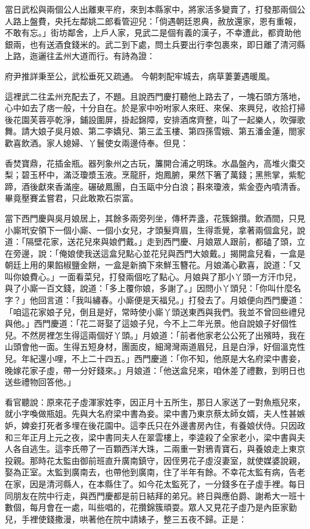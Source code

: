\begin{showcontents}{}
當日武松與兩個公人出離東平府，來到本縣家中，將家活多變賣了，打發那兩個公人路上盤費，央托左鄰姚二郎看管迎兒：「倘遇朝廷恩典，赦放還家，恩有重報，不敢有忘。」街坊鄰舍，上戶人家，見武二是個有義的漢子，不幸遭此，都資助他銀兩，也有送酒食錢米的。武二到下處，問土兵要出行李包裹來，即日離了清河縣上路，迤邐往孟州大道而行。有詩為證：

府尹推詳秉至公，武松垂死又疏通。
今朝刺配牢城去，病草萋萋遇暖風。

這裡武二往孟州充配去了，不題。且說西門慶打聽他上路去了，一塊石頭方落地，心中如去了痞一般，十分自在。於是家中吩咐家人來旺、來保、來興兒，收拾打掃後花園芙蓉亭乾淨，鋪設圍屏，掛起錦障，安排酒席齊整，叫了一起樂人，吹彈歌舞。請大娘子吳月娘、第二李嬌兒、第三孟玉樓、第四孫雪娥、第五潘金蓮，閤家歡喜飲酒。家人媳婦、丫鬟使女兩邊侍奉。但見：

香焚寶鼎，花插金瓶。器列象州之古玩，簾開合浦之明珠。水晶盤內，高堆火棗交梨；碧玉杯中，滿泛瓊漿玉液。烹龍肝，炮鳳腑，果然下箸了萬錢；黑熊掌，紫駝蹄，酒後獻來香滿座。碾破鳳團，白玉甌中分白浪；斟來瓊液，紫金壺內噴清香。畢竟壓賽孟嘗君，只此敢欺石崇富。

當下西門慶與吳月娘居上，其餘多兩旁列坐，傳杯弄盞，花簇錦攢。飲酒間，只見小廝玳安領下一個小廝、一個小女兒，才頭髮齊眉，生得乖覺，拿著兩個盒兒，說道：「隔壁花家，送花兒來與娘們戴。」走到西門慶、月娘眾人跟前，都磕了頭，立在旁邊，說：「俺娘使我送這盒兒點心並花兒與西門大娘戴。」揭開盒兒看，一盒是朝廷上用的果餡椒鹽金餅，一盒是新摘下來鮮玉簪花。月娘滿心歡喜，說道：「又叫你娘費心。」一面看菜兒，打發兩個吃了點心。月娘與了那小丫頭一方汗巾兒，與了小廝一百文錢，說道：「多上覆你娘，多謝了。」因問小丫頭兒：「你叫什麼名字？」他回言道：「我叫繡春。小廝便是天福兒。」打發去了。月娘便向西門慶道：「咱這花家娘子兒，倒且是好，常時使小廝丫頭送東西與我們。我並不曾回些禮兒與他。」西門慶道：「花二哥娶了這娘子兒，今不上二年光景。他自說娘子好個性兒。不然房裡怎生得這兩個好丫頭。」月娘道：「前者他家老公公死了出殯時，我在山頭會他一面。生得五短身材，團面皮，細灣灣兩道眉兒，且是白淨，好個溫克性兒。年紀還小哩，不上二十四五。」西門慶道：「你不知，他原是大名府梁中書妾，晚嫁花家子虛，帶一分好錢來。」月娘道：「他送盒兒來，咱休差了禮數，到明日也送些禮物回答他。」

看官聽說：原來花子虛渾家姓李，因正月十五所生，那日人家送了一對魚瓶兒來，就小字喚做瓶姐。先與大名府梁中書為妾。梁中書乃東京蔡太師女婿，夫人性甚嫉妒，婢妾打死者多埋在後花園中。這李氏只在外邊書房內住，有養娘伏侍。只因政和三年正月上元之夜，梁中書同夫人在翠雲樓上，李逵殺了全家老小，梁中書與夫人各自逃生。這李氏帶了一百顆西洋大珠，二兩重一對鴉青寶石，與養娘走上東京投親。那時花太監由御前班直升廣南鎮守，因侄男花子虛沒妻室，就使媒婆說親，娶為正室。太監到廣南去，也帶他到廣南，住了半年有餘。不幸花太監有病，告老在家，因是清河縣人，在本縣住了。如今花太監死了，一分錢多在子虛手裡。每日同朋友在院中行走，與西門慶都是前日結拜的弟兄。終日與應伯爵、謝希大一班十數個，每月會在一處，叫些唱的，花攢錦簇頑耍。眾人又見花子虛乃是內臣家勤兒，手裡使錢撒漫，哄著他在院中請婊子，整三五夜不歸。正是：


\end{showcontents}
